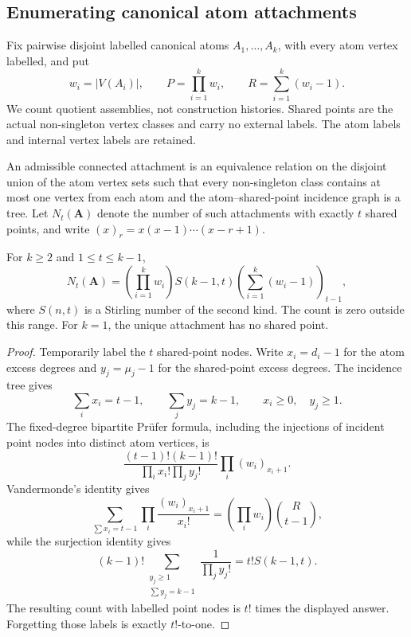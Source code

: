 
\subsection{Enumerating canonical atom attachments}
\label{subsection-canonical-attachment-enumeration}

Fix pairwise disjoint labelled canonical atoms
$A_1,\ldots,A_k$, with every atom vertex labelled, and put
\[
w_i=|V(A_i)|,\qquad
P=\prod_{i=1}^kw_i,\qquad
R=\sum_{i=1}^k(w_i-1).
\]
We count quotient assemblies, not construction histories.  Shared points are
the actual non-singleton vertex classes and carry no external labels.
The atom labels and internal vertex labels are retained.

An admissible connected attachment is an equivalence relation on the disjoint
union of the atom vertex sets such that every non-singleton class contains at
most one vertex from each atom and the atom--shared-point incidence graph is a
tree.  Let $N_t(\mathbf A)$ denote the number of such attachments with exactly
$t$ shared points, and write $(x)_r=x(x-1)\cdots(x-r+1)$.

\begin{theorem}
\label{theorem-exact-canonical-attachment-count}
For $k\ge2$ and $1\le t\le k-1$,
\[
\boxed{
N_t(\mathbf A)
=
\left(\prod_{i=1}^kw_i\right)
S(k-1,t)
\left(\sum_{i=1}^k(w_i-1)\right)_{t-1},
}
\]
where $S(n,t)$ is a Stirling number of the second kind.  The count is zero
outside this range.  For $k=1$, the unique attachment has no shared point.
\end{theorem}

\begin{proof}
Temporarily label the $t$ shared-point nodes.  Write
$x_i=d_i-1$ for the atom excess degrees and
$y_j=\mu_j-1$ for the shared-point excess degrees.  The incidence tree gives
\[
\sum_i x_i=t-1,\qquad
\sum_j y_j=k-1,\qquad
x_i\ge0,\quad y_j\ge1.
\]
The fixed-degree bipartite Prüfer formula, including the injections of incident
point nodes into distinct atom vertices, is
\[
\frac{(t-1)!(k-1)!}
{\prod_i x_i!\prod_j y_j!}
\prod_i(w_i)_{x_i+1}.
\]
Vandermonde's identity gives
\[
\sum_{\sum x_i=t-1}
\prod_i\frac{(w_i)_{x_i+1}}{x_i!}
=
\left(\prod_iw_i\right)\binom{R}{t-1},
\]
while the surjection identity gives
\[
(k-1)!\sum_{\substack{y_j\ge1\\\sum y_j=k-1}}
\frac1{\prod_jy_j!}
=t!S(k-1,t).
\]
The resulting count with labelled point nodes is $t!$ times the displayed
answer.  Forgetting those labels is exactly $t!$-to-one.
\end{proof}

